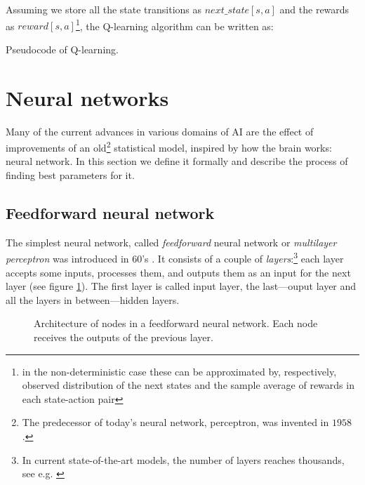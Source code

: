 Assuming we store all the state transitions as $next\_state[s, a]$ and the rewards as $reward[s, a]$\footnote{in the non-deterministic case these can be approximated by, respectively, observed distribution of the next states and the sample average of rewards in each state-action pair}, the Q-learning algorithm can be written as:

\begin{algorithm} \label{qlearning-pseudo}
  \caption{Pseudocode of Q-learning.}
\end{algorithm}
\section{Neural networks}
Many of the current advances in various domains of AI are the effect of improvements of an old\footnote{The predecessor of today's neural network, perceptron, was invented in $1958$ \cite{perceptron}.} statistical model, inspired by how the brain works: neural network. In this section we define it formally and describe the process of finding best parameters for it.

\subsection{Feedforward neural network}
The simplest neural network, called \emph{feedforward} neural network or \emph{multilayer perceptron} was introduced in 60's \cite{mlp}.
It consists of a couple of \emph{layers}:\footnote{In current state-of-the-art models, the number of layers reaches thousands, see e.g. \cite{stochastic}} each layer accepts some inputs, processes them, and outputs them as an input for the next layer (see figure \ref{ann-layers}). The first layer is called input layer, the last---ouput layer and all the layers in between---hidden layers.
\begin{figure}[h]
  \centering
  \resizebox{0.6\textwidth}{!}{
  
  }
  \caption{Architecture of nodes in a feedforward neural network. Each node receives the outputs of the previous layer.}\label{ann-layers} 
\end{figure}

